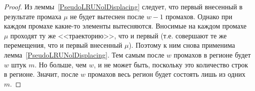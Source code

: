 \theoremtext{\ref{thm:PseudoLRU_essential}}{\PseudoLRUEssential}
\begin{proof}
    Из леммы~\ref{PseudoLRUNolDisplacing} следует, что первый внесенный в результате промаха $\mu$ не будет вытеснен после $w{-}1$ промахов. Однако при каждом промахе какие-то элементы вытесняются. Вносимые на каждом промахе $\mu$ проходят ту же <<траекторию>>, что и первый (т.е. совершают те же перемещения, что и первый внесенный $\mu$). Поэтому к ним снова применима лемма~\ref{PseudoLRUNolDisplacing}. Тем самым после $w$ промахов в регионе будет $w$ штук $m$. Но больше, чем $w$, и не может быть, поскольку это количество строк в регионе. Значит, после $w$ промахов весь регион будет состоять лишь из одних $m$.
\end{proof}

\theoremtext{\ref{thm_mirror_lenth_lru}}{\UpperBoundLRUMirror}
